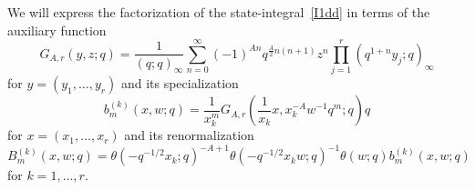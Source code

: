 \documentclass[12pt,reqno]{amsart}
\theoremstyle{definition}
\def\th{\theta}
\begin{document}
We will express the factorization of the state-integral~\eqref{I1dd}
in terms of the auxiliary function
\begin{equation}
  \label{Gar}
  G_{A,r}(y,z;q)
  =\frac{1}{(q;q)_\infty} \sum_{n=0}^\infty
  (-1)^{An} q^{\frac{A}{2}n(n+1)} z^n \prod_{j=1}^{r}(q^{1+n}y_j;q)_\infty 
\end{equation}
for $y=(y_1,\dots,y_r)$ and its specialization 
\begin{equation}
  \label{bmxw}
  b^{(k)}_{m}(x,w;q)
  = \frac{1}{x_k^{m}}
  G_{A,r}\left(\frac{1}{x_k} x, x_k^{-A} w^{-1} q^{m};q \right)
  q\end{equation}
for $x=(x_1,\dots,x_r)$ 
and its renormalization 
\begin{equation}
  \label{Bmxw}
  B^{(k)}_{m}(x,w;q) =
  \th(-q^{-1/2}x_k;q)^{-A+1}\th(-q^{-1/2}x_k w;q)^{-1}\th(w;q)
  b^{(k)}_{m}(x,w;q)
\end{equation}
for $k=1,\dots,r$.
\end{document}

